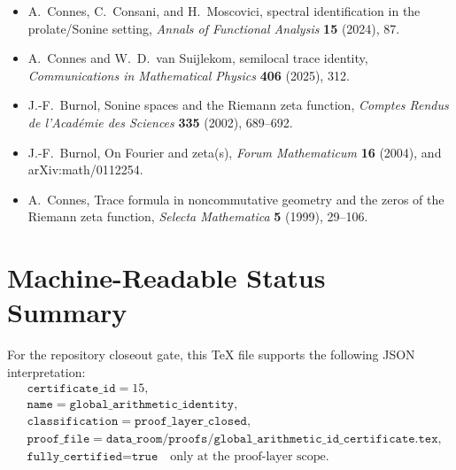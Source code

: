 \documentclass[11pt]{article}
\begin{document}
\begin{itemize}
  \item A.~Connes, C.~Consani, and H.~Moscovici, spectral identification in the
  prolate/Sonine setting, \emph{Annals of Functional Analysis} \textbf{15}
  (2024), 87.

  \item A.~Connes and W.~D.~van Suijlekom, semilocal trace identity,
  \emph{Communications in Mathematical Physics} \textbf{406} (2025), 312.

  \item J.-F.~Burnol, Sonine spaces and the Riemann zeta function,
  \emph{Comptes Rendus de l'Acad\'emie des Sciences} \textbf{335} (2002),
  689--692.

  \item J.-F.~Burnol, On Fourier and zeta(s), \emph{Forum Mathematicum}
  \textbf{16} (2004), and arXiv:math/0112254.

  \item A.~Connes, Trace formula in noncommutative geometry and the zeros of
  the Riemann zeta function, \emph{Selecta Mathematica} \textbf{5} (1999),
  29--106.
\end{itemize}

\section{Machine-Readable Status Summary}

For the repository closeout gate, this TeX file supports the following JSON
interpretation:
\[
\begin{aligned}
&\texttt{certificate\_id}=15,\\
&\texttt{name}=\texttt{global\_arithmetic\_identity},\\
&\texttt{classification}=\texttt{proof\_layer\_closed},\\
&\texttt{proof\_file}=\texttt{data\_room/proofs/global\_arithmetic\_id\_certificate.tex},\\
&\texttt{fully\_certified}=\texttt{true}\quad\text{only at the proof-layer scope.}
\end{aligned}
\]
\end{document}
